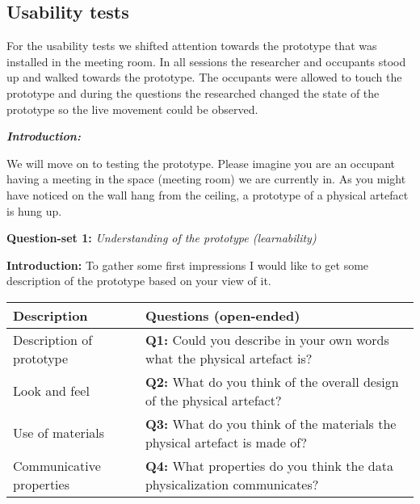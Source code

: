 \begin{appendices}
\newpage

\section{Usability tests}
\label{appendix:usability}

For the usability tests we shifted attention towards the prototype that was installed in the meeting room. In all sessions the researcher and occupants stood up and walked towards the prototype. The occupants were allowed to touch the prototype and during the questions the researched changed the state of the prototype so the live movement could be observed.

\vspace{5pt}

\textit{\textbf{Introduction:}}

We will move on to testing the prototype. Please imagine you are an occupant having a meeting in the space (meeting room) we are currently in. As you might have noticed on the wall hang from the ceiling, a prototype of a physical artefact is hung up.\\

\begin{table}[htbp]
    \captionsetup{justification=raggedright,singlelinecheck=false}
    \raggedright \textbf{Question-set 1:} \textit{Understanding of the prototype (learnability)} \\
    \raggedright \textbf{Introduction:} To gather some first impressions I would like to get some description of the prototype based on your view of it.
    \label{tab:column_widths}
    \begin{tabularx}{\textwidth}{|p{}|X|}
        \hline
        \textbf{Description} & \textbf{Questions (open-ended)} \\
        \hline
        Description of prototype & \textbf{Q1:} Could you describe in your own words what the physical artefact is? \\
        \hline
        Look and feel & 
        \textbf{Q2:} What do you think of the overall design of the physical artefact? \\
        \hline
        Use of materials & 
        \textbf{Q3:} What do you think of the materials the physical artefact is made of? \\
        \hline
        Communicative properties & 
        \textbf{Q4:} What properties do you think the data physicalization communicates?\\
        \hline        
    \end{tabularx}
\end{table}


\end{appendices}
